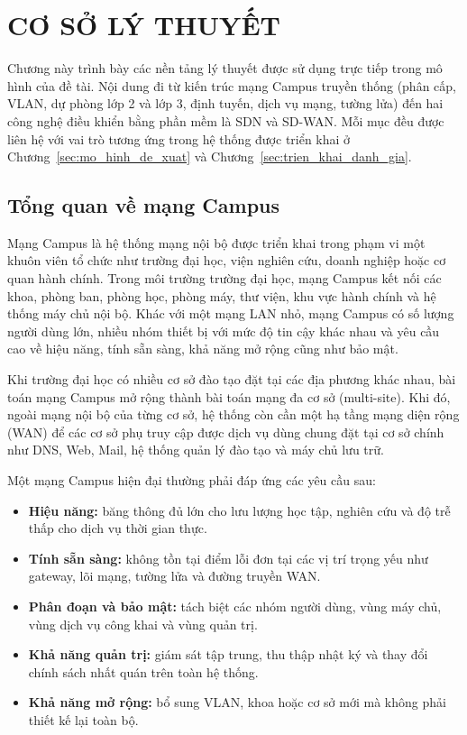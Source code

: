 \section{CƠ SỞ LÝ THUYẾT}\label{sec:co_so_ly_thuyet}

Chương này trình bày các nền tảng lý thuyết được sử dụng trực tiếp trong mô hình của đề tài. Nội dung đi từ kiến trúc mạng Campus truyền thống (phân cấp, VLAN, dự phòng lớp 2 và lớp 3, định tuyến, dịch vụ mạng, tường lửa) đến hai công nghệ điều khiển bằng phần mềm là SDN và SD-WAN. Mỗi mục đều được liên hệ với vai trò tương ứng trong hệ thống được triển khai ở Chương~\ref{sec:mo_hinh_de_xuat} và Chương~\ref{sec:trien_khai_danh_gia}.

\subsection{Tổng quan về mạng Campus}

Mạng Campus là hệ thống mạng nội bộ được triển khai trong phạm vi một khuôn viên tổ chức như trường đại học, viện nghiên cứu, doanh nghiệp hoặc cơ quan hành chính. Trong môi trường trường đại học, mạng Campus kết nối các khoa, phòng ban, phòng học, phòng máy, thư viện, khu vực hành chính và hệ thống máy chủ nội bộ. Khác với một mạng LAN nhỏ, mạng Campus có số lượng người dùng lớn, nhiều nhóm thiết bị với mức độ tin cậy khác nhau và yêu cầu cao về hiệu năng, tính sẵn sàng, khả năng mở rộng cũng như bảo mật.

Khi trường đại học có nhiều cơ sở đào tạo đặt tại các địa phương khác nhau, bài toán mạng Campus mở rộng thành bài toán mạng đa cơ sở (multi-site). Khi đó, ngoài mạng nội bộ của từng cơ sở, hệ thống còn cần một hạ tầng mạng diện rộng (WAN) để các cơ sở phụ truy cập được dịch vụ dùng chung đặt tại cơ sở chính như DNS, Web, Mail, hệ thống quản lý đào tạo và máy chủ lưu trữ.

Một mạng Campus hiện đại thường phải đáp ứng các yêu cầu sau:
\begin{itemize}
    \item \textbf{Hiệu năng:} băng thông đủ lớn cho lưu lượng học tập, nghiên cứu và độ trễ thấp cho dịch vụ thời gian thực.
    \item \textbf{Tính sẵn sàng:} không tồn tại điểm lỗi đơn tại các vị trí trọng yếu như gateway, lõi mạng, tường lửa và đường truyền WAN.
    \item \textbf{Phân đoạn và bảo mật:} tách biệt các nhóm người dùng, vùng máy chủ, vùng dịch vụ công khai và vùng quản trị.
    \item \textbf{Khả năng quản trị:} giám sát tập trung, thu thập nhật ký và thay đổi chính sách nhất quán trên toàn hệ thống.
    \item \textbf{Khả năng mở rộng:} bổ sung VLAN, khoa hoặc cơ sở mới mà không phải thiết kế lại toàn bộ.
\end{itemize}

